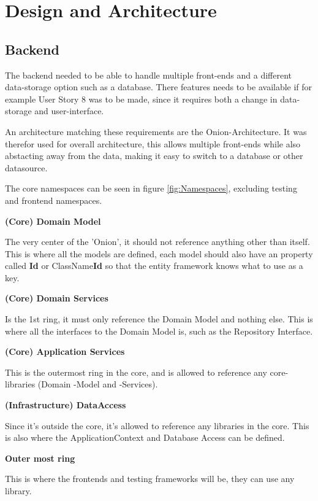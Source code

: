 \chapter{Design and Architecture}

\section{Backend}

The backend needed to be able to handle multiple front-ends and a different data-storage option such as a database. There features needs to be available if for example User Story 8 was to be made, since it requires both a change in data-storage and user-interface.

An architecture matching these requirements are the Onion-Architecture. It was therefor used for overall architecture, this allows multiple front-ends while also abstacting away from the data, making it easy to switch to a database or other datasource.

The core namespaces can be seen in figure \vref{fig:Namespaces}, excluding testing and frontend namespaces.

\textbf{(Core) Domain Model}
 
The very center of the 'Onion', it should not reference anything other than itself. This is where all the models are defined, each model should also have an property called \textbf{Id} or ClassName\textbf{Id} so that the entity framework knows what to use as a key.

\textbf{(Core) Domain Services}

Is the 1st ring, it must only reference the Domain Model and nothing else. This is where all the interfaces to the Domain Model is, such as the Repository Interface.

\textbf{(Core) Application Services}

This is the outermost ring in the core, and is allowed to reference any core-libraries (Domain -Model and -Services).

\textbf{(Infrastructure) DataAccess}

Since it's outside the core, it's allowed to reference any libraries in the core. This is also where the ApplicationContext and Database Access can be defined. 

\textbf{Outer most ring}

This is where the frontends and testing frameworks will be, they can use any library.

